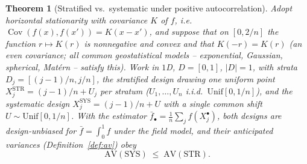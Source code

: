 \documentclass{amsart}
\newtheorem{theorem}{Theorem}
\theoremstyle{definition}
\newcommand{\Cov}{\operatorname{Cov}}
\begin{document}
\begin{theorem}[Stratified vs.\ systematic under positive
autocorrelation]\label{thm:sys}
Adopt horizontal stationarity with covariance $K$ of $f$, i.e.\
$\Cov(f(x),f(x'))=K(x-x')$, and suppose that on $[0,2/n]$ the function
$r\mapsto K(r)$ is nonnegative and \emph{convex} and that $K(-r)=K(r)$
(an even covariance; all common geostatistical models -- exponential,
Gaussian, spherical, Mat\'ern -- satisfy this). Work in $1$D, $D=[0,1]$,
$|D|=1$, with strata $D_j=[(j-1)/n,j/n]$, the stratified design drawing one
uniform point $X_j^{\mathrm{STR}}=(j-1)/n+U_j$ per stratum
($U_1,\dots,U_n$ i.i.d.\ $\mathrm{Unif}[0,1/n]$), and the systematic design
$X_j^{\mathrm{SYS}}=(j-1)/n+U$ with a single common shift
$U\sim\mathrm{Unif}[0,1/n]$. With the estimator
$\bar f_\bullet=\frac1n\sum_j f(X_j^\bullet)$, both designs are
design-unbiased for $\bar f=\int_0^1 f$ under the field model, and their
\emph{anticipated variances} (Definition~\ref{def:av}) obey
\begin{equation}\label{eq:sysleqstr}
\mathrm{AV}(\mathrm{SYS})\;\le\;\mathrm{AV}(\mathrm{STR}).
\end{equation}
\end{theorem}
\end{document}
